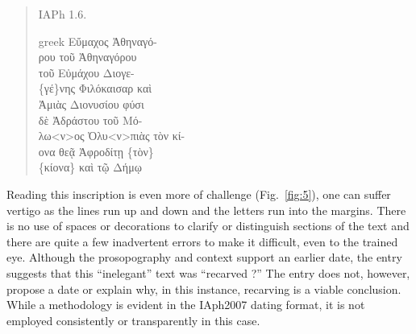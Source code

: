 \documentclass[amsthm,ebook]{saparticle}
\begin{document}
\begin{quotation}
\noindent IAPh 1.6.\\
\begin{otherlanguage*}{greek}
\noindent Εὔμαχος Ἀθηναγό-\\
ρου τοῦ Ἀθηναγόρου\\
τοῦ Εὐμάχου Διογε-\\
\{γέ\}νης Φιλόκαισαρ καὶ\\
  Ἀμιὰς Διονυσίου φύσι\\
δὲ Ἀδράστου τοῦ Μό-\\
λω<ν>ος Ὀλυ<ν>πιὰς τὸν κί-\\
ονα θεᾷ Ἀφροδίτῃ \{τὸν\}\\
\{κίονα\} καὶ τῷ Δήμῳ
\end{otherlanguage*}
\end{quotation}


Reading this inscription is even more of challenge (Fig.~\ref{fig:5}), one can suffer vertigo as the
lines run up and down and the letters run into the margins. There is no use of spaces or decorations to clarify or
distinguish sections of the text and there are quite a few inadvertent errors to make it difficult, even to the trained
eye. Although the prosopography and context support an earlier date, the entry suggests that this ``inelegant'' text was
``recarved ?'' The entry does not, however, propose a date or explain why, in this instance, recarving is a viable
conclusion. While a methodology is evident in the IAph2007 dating format, it is not employed consistently or
transparently in this case. 
\end{document}

